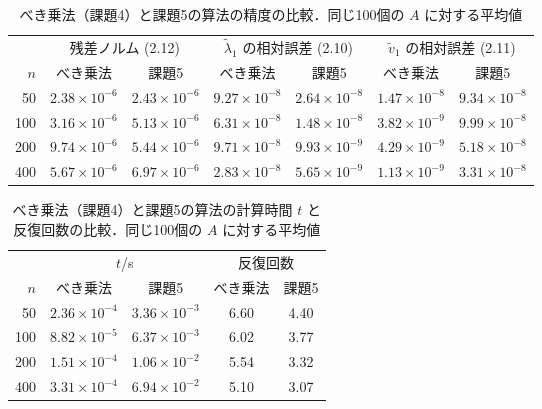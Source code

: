 \documentclass{jarticle}
\begin{document}
\begin{table}[htbp]
    \centering
    \footnotesize\setlength{\tabcolsep}{3pt}
    \caption{べき乗法（課題4）と課題5の算法の精度の比較．同じ100個の $A$ に対する平均値}
    \label{tab:work5_acc}
    \begin{tabular}{rcccccc}
        \hline
        & \multicolumn{2}{c}{残差ノルム (2.12)} & \multicolumn{2}{c}{$\tilde{\lambda}_1$ の相対誤差 (2.10)} & \multicolumn{2}{c}{$\tilde{v}_1$ の相対誤差 (2.11)} \\
        $n$ & べき乗法 & 課題5 & べき乗法 & 課題5 & べき乗法 & 課題5 \\
        \hline
        50 & $2.38\times10^{-6}$ & $2.43\times10^{-6}$ & $9.27\times10^{-8}$ & $2.64\times10^{-8}$ & $1.47\times10^{-8}$ & $9.34\times10^{-8}$ \\
        100 & $3.16\times10^{-6}$ & $5.13\times10^{-6}$ & $6.31\times10^{-8}$ & $1.48\times10^{-8}$ & $3.82\times10^{-9}$ & $9.99\times10^{-8}$ \\
        200 & $9.74\times10^{-6}$ & $5.44\times10^{-6}$ & $9.71\times10^{-8}$ & $9.93\times10^{-9}$ & $4.29\times10^{-9}$ & $5.18\times10^{-8}$ \\
        400 & $5.67\times10^{-6}$ & $6.97\times10^{-6}$ & $2.83\times10^{-8}$ & $5.65\times10^{-9}$ & $1.13\times10^{-9}$ & $3.31\times10^{-8}$ \\
        \hline
    \end{tabular}
\end{table}

\begin{table}[htbp]
    \centering
    \footnotesize\setlength{\tabcolsep}{3pt}
    \caption{べき乗法（課題4）と課題5の算法の計算時間 $t$ と反復回数の比較．同じ100個の $A$ に対する平均値}
    \label{tab:work5_spd}
    \begin{tabular}{rcccc}
        \hline
        & \multicolumn{2}{c}{$t$/s} & \multicolumn{2}{c}{反復回数} \\
        $n$ & べき乗法 & 課題5 & べき乗法 & 課題5 \\
        \hline
        50 & $2.36\times10^{-4}$ & $3.36\times10^{-3}$ & 6.60 & 4.40 \\
        100 & $8.82\times10^{-5}$ & $6.37\times10^{-3}$ & 6.02 & 3.77 \\
        200 & $1.51\times10^{-4}$ & $1.06\times10^{-2}$ & 5.54 & 3.32 \\
        400 & $3.31\times10^{-4}$ & $6.94\times10^{-2}$ & 5.10 & 3.07 \\
        \hline
    \end{tabular}
\end{table}
\end{document}
